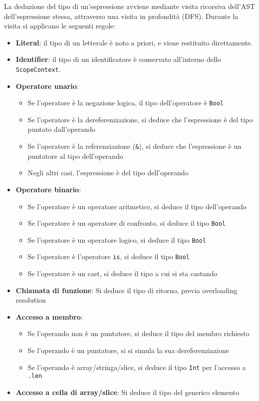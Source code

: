 \newpage

La deduzione del tipo di un'espressione avviene mediante visita ricorsiva dell'AST dell'espressione stessa,
attraverso una visita in profondità (DFS). Durante la visita si applicano le seguenti regole:

\vspace{1cm}
\begin{itemize}
    \item \textbf{Literal}: il tipo di un letterale è noto a priori, e viene restituito direttamente.
    \item \textbf{Identifier}: il tipo di un identificatore è conservato all'interno dello \texttt{ScopeContext}.
    \item \textbf{Operatore unario}: \begin{itemize}
        \item Se l'operatore è la negazione logica, il tipo dell'operatore è \texttt{Bool}
        \item Se l'operatore è la dereferenziazione, si deduce che l'espressione è del tipo puntato dall'operando
        \item Se l'operatore è la referenziazione (\texttt{\&}), si deduce che l'espressione è un puntatore al tipo dell'operando
        \item Negli altri casi, l'espressione è del tipo dell'operando
    \end{itemize}
    \item \textbf{Operatore binario}: \begin{itemize}
        \item Se l'operatore è un operatore aritmetico, si deduce il tipo dell'operando
        \item Se l'operatore è un operatore di confronto, si deduce il tipo \texttt{Bool}
        \item Se l'operatore è un operatore logico, si deduce il tipo \texttt{Bool}
        \item Se l'operatore è l'operatore \texttt{is}, si deduce il tipo \texttt{Bool}
        \item Se l'operatore è un cast, si deduce il tipo a cui si sta castando
    \end{itemize}
    \item \textbf{Chiamata di funzione}: Si deduce il tipo di ritorno, previa overloading resolution
    \item \textbf{Accesso a membro}: \begin{itemize}
        \item Se l'operando non è un puntatore, si deduce il tipo del membro richiesto
        \item Se l'operando è un puntatore, si si simula la sua dereferenziazione
        \item Se l'operando è array/stringa/slice, si deduce il tipo \texttt{Int} per l'accesso a \texttt{.len}
    \end{itemize}
    \item \textbf{Accesso a cella di array/slice}: Si deduce il tipo del generico elemento
\end{itemize}

\newpage